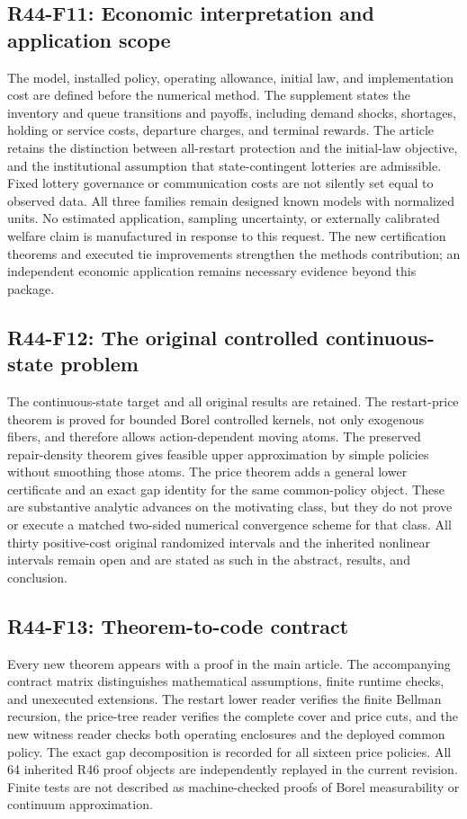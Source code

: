 \subsection{R44-F11: Economic interpretation and application scope}
The model, installed policy, operating allowance, initial law, and implementation cost are defined before the numerical method. The supplement states the inventory and queue transitions and payoffs, including demand shocks, shortages, holding or service costs, departure charges, and terminal rewards. The article retains the distinction between all-restart protection and the initial-law objective, and the institutional assumption that state-contingent lotteries are admissible. Fixed lottery governance or communication costs are not silently set equal to observed data. All three families remain designed known models with normalized units. No estimated application, sampling uncertainty, or externally calibrated welfare claim is manufactured in response to this request. The new certification theorems and executed tie improvements strengthen the methods contribution; an independent economic application remains necessary evidence beyond this package.

\subsection{R44-F12: The original controlled continuous-state problem}
The continuous-state target and all original results are retained. The restart-price theorem is proved for bounded Borel controlled kernels, not only exogenous fibers, and therefore allows action-dependent moving atoms. The preserved repair-density theorem gives feasible upper approximation by simple policies without smoothing those atoms. The price theorem adds a general lower certificate and an exact gap identity for the same common-policy object. These are substantive analytic advances on the motivating class, but they do not prove or execute a matched two-sided numerical convergence scheme for that class. All thirty positive-cost original randomized intervals and the inherited nonlinear intervals remain open and are stated as such in the abstract, results, and conclusion.

\subsection{R44-F13: Theorem-to-code contract}
Every new theorem appears with a proof in the main article. The accompanying contract matrix distinguishes mathematical assumptions, finite runtime checks, and unexecuted extensions. The restart lower reader verifies the finite Bellman recursion, the price-tree reader verifies the complete cover and price cuts, and the new witness reader checks both operating enclosures and the deployed common policy. The exact gap decomposition is recorded for all sixteen price policies. All 64 inherited R46 proof objects are independently replayed in the current revision. Finite tests are not described as machine-checked proofs of Borel measurability or continuum approximation.

